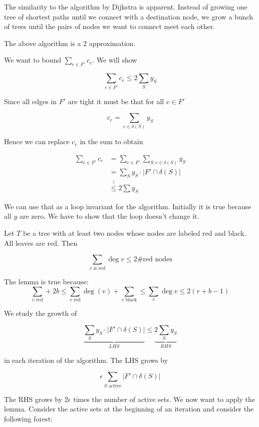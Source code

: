 The similarity to the algorithm by Dijkstra is apparent. Instead of growing one tree of shortest paths until we connect with a destination node, we grow a bunch of trees until the pairs of nodes we want to connect meet each other.

\begin{thm} The above algorithm is a 2 approximation.\end{thm}

\begin{pr} We want to bound $\sum_{e\in F'} c_e$. We will show

\[\sum_{e\in F'} c_e \leq 2 \sum_S y_S\]

Since all edges in $F'$ are tight it must be that for all $e\in F'$ 

\[c_e = \sum_{e\in\delta(S)} y_S\]

Hence we can replace $c_e$ in the sum to obtain

\begin{align*}
\sum_{e\in F'} c_e &= \sum_{e\in F'} \sum_{S; e\in \delta(S)} y_S\\
	&= \sum_S  y_S \cdot |F'\cap \delta(S)|\\
	&\stackrel{!}{\leq} 2\sum y_S
\end{align*}

We can use that as a loop invariant for the algorithm. Initially it is true because all $y$ are zero. We have to show that the loop doesn't change it.

\begin{lem} Let $T$ be a tree with at least two nodes whose nodes are labeled red and black. All leaves are red. Then

\[\sum_{v\text{ is red}} \deg v \leq 2 \text{\# red nodes}\]

\end{lem}


The lemma is true because:
\[\sum_{v\text{ red}} +2b \leq \sum_{v\text{ red}} \deg (v) + \sum_{v \text{ black}} \leq \sum_v \deg v \leq 2(r+b-1)\]

We study the growth of 

\[\underbrace{\sum_S  y_S \cdot |F'\cap \delta(S)|}_{LHS} \leq \underbrace{2\sum_S y_S}_{RHS}\]

in each iteration of the algorithm. The LHS grows by 

\[\epsilon \sum_{S\text{ active}} |F'\cap \delta(S)|\]

The RHS grows by $2\epsilon$ times the number of active sets. We now want to apply the lemma. Consider the active sets at the beginning of an iteration and consider the following forest:


\end{pr}
